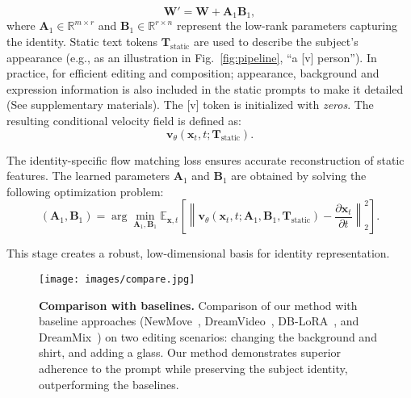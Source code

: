 \begin{equation}
\mathbf{W}' = \mathbf{W} + \mathbf{A}_1 \mathbf{B}_1,
\end{equation}
where $\mathbf{A}_1 \in \mathbb{R}^{m \times r}$ and $\mathbf{B}_1 \in \mathbb{R}^{r \times n}$ represent the low-rank parameters capturing the identity. Static text tokens $\mathbf{T}_{\text{static}}$ are used to describe the subject’s appearance (e.g., as an illustration in Fig.~\ref{fig:pipeline}, “a [v] person”). In practice, for efficient editing and composition; appearance, background and expression information is also included in the static prompts to make it detailed (See supplementary materials). The [v] token is initialized with \textit{zeros}. The resulting conditional velocity field is defined as:
\begin{equation}
\mathbf{v}_\theta (\mathbf{x}_t, t; \mathbf{T}_{\text{static}}).
\end{equation}

The identity-specific flow matching loss ensures accurate reconstruction of static features. The learned parameters \(\mathbf{A}_1\) and \(\mathbf{B}_1\) are obtained by solving the following optimization problem:
\begin{equation}
(\mathbf{A}_1, \mathbf{B}_1) = \arg \min_{\mathbf{A}_1, \mathbf{B}_1} \mathbb{E}_{\mathbf{x}, t} \left[ \left\| \mathbf{v}_\theta (\mathbf{x}_t, t; \mathbf{A}_1, \mathbf{B}_1, \mathbf{T}_{\text{static}}) - \frac{\partial \mathbf{x}_t}{\partial t} \right\|_2^2 \right].
\end{equation}

This stage creates a robust, low-dimensional basis for identity representation.

\begin{figure*}[t!]
        \centering
        \texttt{[image: images/compare.jpg]}
        \caption{\textbf{Comparison with baselines.} Comparison of our method with baseline approaches (NewMove~\cite{materzynska2024newmove}, DreamVideo~\cite{wei2023dreamvideo}, DB-LoRA~\cite{simo,ruiz2023dreambooth}, and DreamMix~\cite{molad2023dreamixvideodiffusionmodels}) on two editing scenarios: changing the background and shirt, and adding a glass. Our method demonstrates superior adherence to the prompt while preserving the subject identity, outperforming the baselines.}
        \label{fig:compare}
    \end{figure*}

